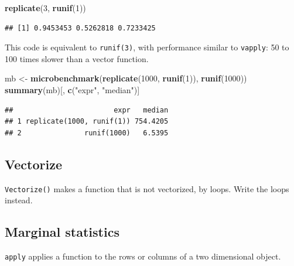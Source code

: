 \documentclass[
  12pt,
  american,
  a4paper,
  extrafontsizes,onecolumn,openright
  ]{memoir}
\newenvironment{Shaded}{\begin{snugshade}}{\end{snugshade}}
\newcommand{\DecValTok}[1]{\textcolor[rgb]{0.00,0.00,0.81}{#1}}
\newcommand{\FunctionTok}[1]{\textcolor[rgb]{0.13,0.29,0.53}{\textbf{#1}}}
\newcommand{\NormalTok}[1]{#1}
\newcommand{\OtherTok}[1]{\textcolor[rgb]{0.56,0.35,0.01}{#1}}
\newcommand{\StringTok}[1]{\textcolor[rgb]{0.31,0.60,0.02}{#1}}
\newlength{\rf}
\begin{document}
\scriptsize

\begin{Shaded}
\begin{Highlighting}[]
\FunctionTok{replicate}\NormalTok{(}\DecValTok{3}\NormalTok{, }\FunctionTok{runif}\NormalTok{(}\DecValTok{1}\NormalTok{))}
\end{Highlighting}
\end{Shaded}

\begin{verbatim}
## [1] 0.9453453 0.5262818 0.7233425
\end{verbatim}

\normalsize

This code is equivalent to \texttt{runif(3)}, with performance similar to \texttt{vapply}: 50 to 100 times slower than a vector function.

\scriptsize

\begin{Shaded}
\begin{Highlighting}[]
\NormalTok{mb }\OtherTok{\textless{}{-}} \FunctionTok{microbenchmark}\NormalTok{(}\FunctionTok{replicate}\NormalTok{(}\DecValTok{1000}\NormalTok{, }\FunctionTok{runif}\NormalTok{(}\DecValTok{1}\NormalTok{)), }\FunctionTok{runif}\NormalTok{(}\DecValTok{1000}\NormalTok{))}
\FunctionTok{summary}\NormalTok{(mb)[, }\FunctionTok{c}\NormalTok{(}\StringTok{"expr"}\NormalTok{, }\StringTok{"median"}\NormalTok{)]}
\end{Highlighting}
\end{Shaded}

\begin{verbatim}
##                        expr   median
## 1 replicate(1000, runif(1)) 754.4205
## 2               runif(1000)   6.5395
\end{verbatim}

\normalsize

\subsection{Vectorize}\label{vectorize}

\texttt{Vectorize()} makes a function that is not vectorized, by loops.
Write the loops instead.

\subsection{Marginal statistics}\label{marginal-statistics}

\texttt{apply} applies a function to the rows or columns of a two dimensional object.
\end{document}
